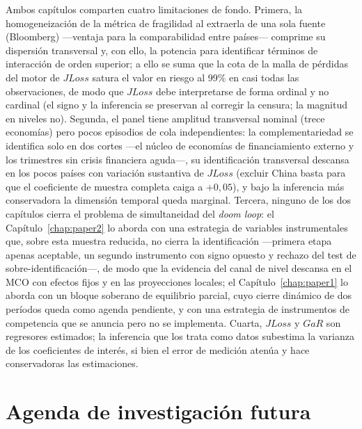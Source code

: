 Ambos capítulos comparten cuatro limitaciones de fondo. Primera, la homogeneización de la métrica de fragilidad al extraerla de una sola fuente (Bloomberg) —ventaja para la comparabilidad entre países— comprime su dispersión transversal y, con ello, la potencia para identificar términos de interacción de orden superior; a ello se suma que la cota de la malla de pérdidas del motor de $JLoss$ satura el valor en riesgo al 99\% en casi todas las observaciones, de modo que $JLoss$ debe interpretarse de forma ordinal y no cardinal (el signo y la inferencia se preservan al corregir la censura; la magnitud en niveles no). Segunda, el panel tiene amplitud transversal nominal (trece economías) pero pocos episodios de cola independientes: la complementariedad se identifica solo en dos cortes —el núcleo de economías de financiamiento externo y los trimestres sin crisis financiera aguda—, su identificación transversal descansa en los pocos países con variación sustantiva de $JLoss$ (excluir China basta para que el coeficiente de muestra completa caiga a $+0{,}05$), y bajo la inferencia más conservadora la dimensión temporal queda marginal. Tercera, ninguno de los dos capítulos cierra el problema de simultaneidad del \textit{doom loop}: el Capítulo~\ref{chap:paper2} lo aborda con una estrategia de variables instrumentales que, sobre esta muestra reducida, no cierra la identificación —primera etapa apenas aceptable, un segundo instrumento con signo opuesto y rechazo del test de sobre-identificación—, de modo que la evidencia del canal de nivel descansa en el MCO con efectos fijos y en las proyecciones locales; el Capítulo~\ref{chap:paper1} lo aborda con un bloque soberano de equilibrio parcial, cuyo cierre dinámico de dos períodos queda como agenda pendiente, y con una estrategia de instrumentos de competencia que se anuncia pero no se implementa. Cuarta, $JLoss$ y $GaR$ son regresores estimados; la inferencia que los trata como datos subestima la varianza de los coeficientes de interés, si bien el error de medición atenúa y hace conservadoras las estimaciones.

\section{Agenda de investigación futura}

